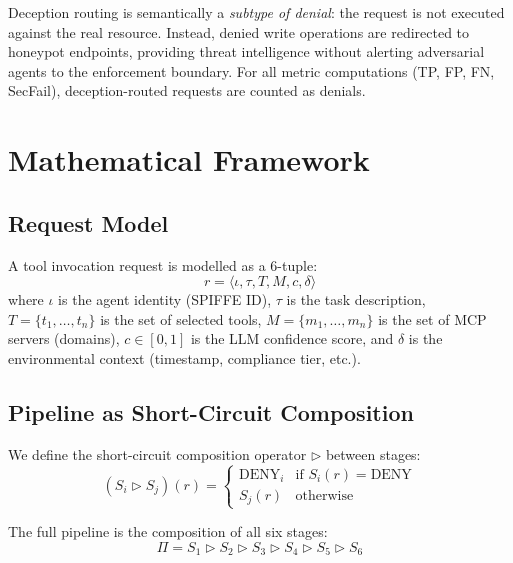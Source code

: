 \documentclass[10pt,a4paper,twocolumn]{article}
\begin{document}
Deception routing is semantically a \emph{subtype of denial}: the request is not executed against the real resource. Instead, denied write operations are redirected to honeypot endpoints, providing threat intelligence without alerting adversarial agents to the enforcement boundary. For all metric computations (TP, FP, FN, SecFail), deception-routed requests are counted as denials.

\section{Mathematical Framework}
\label{sec:framework}

\subsection{Request Model}
\label{sec:request_model}

A tool invocation request is modelled as a 6-tuple:
\begin{equation}
r = \langle \iota, \tau, T, M, c, \delta \rangle
\label{eq:request}
\end{equation}
where $\iota$ is the agent identity (SPIFFE ID), $\tau$ is the task description, $T = \{t_1, \ldots, t_n\}$ is the set of selected tools, $M = \{m_1, \ldots, m_n\}$ is the set of MCP servers (domains), $c \in [0,1]$ is the LLM confidence score, and $\delta$ is the environmental context (timestamp, compliance tier, etc.).

\subsection{Pipeline as Short-Circuit Composition}
\label{sec:composition}

We define the short-circuit composition operator $\rhd$ between stages:
\begin{equation}
(S_i \rhd S_j)(r) = \begin{cases}
\text{DENY}_i & \text{if } S_i(r) = \text{DENY} \\
S_j(r) & \text{otherwise}
\end{cases}
\label{eq:composition}
\end{equation}

The full pipeline is the composition of all six stages:
\begin{equation}
\Pi = S_1 \rhd S_2 \rhd S_3 \rhd S_4 \rhd S_5 \rhd S_6
\label{eq:pipeline}
\end{equation}
\end{document}
